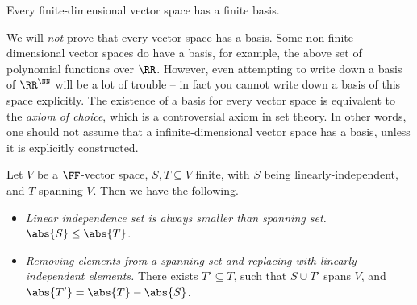 \begin{corollary}
    \label{cor:finite-dimensional-vector-space-has-finite-basis}%
    Every finite-dimensional vector space has a finite basis.
\end{corollary}

\begin{remark}
    We will \emph{not} prove that every vector space has a basis. Some non-finite-dimensional vector spaces do have a basis, for example, the above set of polynomial functions over \(\RR\). However, even attempting to write down a basis of \({\RR}^{\NN}\) will be a lot of trouble -- in fact you cannot write down a basis of this space explicitly. The existence of a basis for every vector space is equivalent to the \emph{axiom of choice}, which is a controversial axiom in set theory. In other words, one should not assume that a infinite-dimensional vector space has a basis, unless it is explicitly constructed.
\end{remark}

\begin{theorem}
    \label{thm:steinitz-exchange-lemma}%
    Let \(V\) be a \(\FF\)-vector space, \(S, T \subseteq V\) finite, with \(S\) being linearly-independent, and \(T\) spanning \(V\). Then we have the following.

    \begin{itemize}
        \item \emph{Linear independence set is always smaller than spanning set.} \(\abs{S} \leq \abs{T}\).
        \item \emph{Removing elements from a spanning set and replacing with linearly independent elements.} There exists \(T' \subseteq T\), such that \(S \cup T'\) spans \(V\), and \(\abs{T'} = \abs{T} - \abs{S}\).
    \end{itemize}
\end{theorem}

